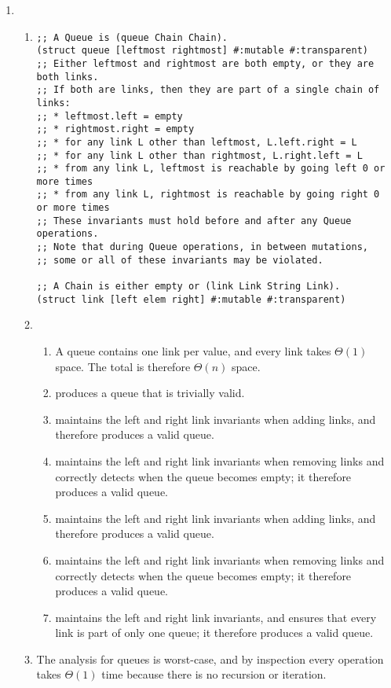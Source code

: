 \documentclass{article}
\begin{document}
\begin{enumerate}
\item
  \begin{enumerate}
  \item
\begin{verbatim}
;; A Queue is (queue Chain Chain).
(struct queue [leftmost rightmost] #:mutable #:transparent)
;; Either leftmost and rightmost are both empty, or they are both links.
;; If both are links, then they are part of a single chain of links:
;; * leftmost.left = empty
;; * rightmost.right = empty
;; * for any link L other than leftmost, L.left.right = L
;; * for any link L other than rightmost, L.right.left = L
;; * from any link L, leftmost is reachable by going left 0 or more times
;; * from any link L, rightmost is reachable by going right 0 or more times
;; These invariants must hold before and after any Queue operations.
;; Note that during Queue operations, in between mutations,
;; some or all of these invariants may be violated.

;; A Chain is either empty or (link Link String Link).
(struct link [left elem right] #:mutable #:transparent)
\end{verbatim}

  \item
    \begin{enumerate}
    \item A queue contains one link per value, and every link takes
      \(\Theta(1)\) space.  The total is therefore \(\Theta(n)\) space.
    \item {} produces a queue that is trivially valid.
    \item {} maintains the left and right link invariants when
      adding links, and therefore produces a valid queue.
    \item {} maintains the left and right link invariants when
      removing links and correctly detects when the queue becomes empty; it
      therefore produces a valid queue.
    \item {} maintains the left and right link invariants when
      adding links, and therefore produces a valid queue.
    \item {} maintains the left and right link invariants
      when removing links and correctly detects when the queue becomes empty; it
      therefore produces a valid queue.
    \item {} maintains the left and right link invariants, and
      ensures that every link is part of only one queue; it therefore produces a
      valid queue.
    \end{enumerate}
  \item The analysis for queues is worst-case, and by inspection every operation
    takes \(\Theta(1)\) time because there is no recursion or iteration.
  \end{enumerate}

\end{enumerate}
\end{document}
